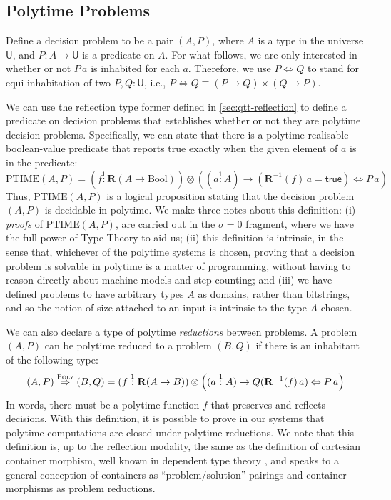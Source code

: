 \documentclass[acmsmall,screen]{acmart}
\newcommand{\BoolTy}{\mathrm{Bool}}
\newcommand{\cTrue}{\mathsf{true}}
\begin{document}
\subsection{Polytime Problems}
\label{sec:polytime-problems}

Define a decision problem to be a pair $(A, P)$, where $A$ is a type
in the universe $\mathsf{U}$, and $P : A \to \mathsf{U}$ is a
predicate on $A$. For what follows, we are only interested in whether
or not $P\,a$ is inhabited for each $a$. Therefore, we use
$P \Leftrightarrow Q$ to stand for equi-inhabitation of two
$P, Q : \mathsf{U}$, i.e.,
$P \Leftrightarrow Q \equiv (P \to Q) \times (Q \to P)$.

We can use the reflection type former defined in
\autoref{sec:qtt-reflection} to define a predicate on decision
problems that establishes whether or not they are polytime decision
problems. Specifically, we can state that there is a polytime
realisable boolean-value predicate that reports true exactly when the
given element of $a$ is in the predicate:
\begin{displaymath}
  \mathrm{PTIME}(A,P) =
    (f \stackrel1: \mathbf{R}(A \to \BoolTy)) \otimes \left((a \stackrel1: A) \to (\mathbf{R}^{-1}(f)\, a = \cTrue) \Leftrightarrow P\,a\right)
\end{displaymath}
Thus, $\mathrm{PTIME}(A,P)$ is a logical proposition stating that the
decision problem $(A,P)$ is decidable in polytime. We make three notes
about this definition: (i) \emph{proofs} of $\mathrm{PTIME}(A,P)$, are
carried out in the $\sigma = 0$ fragment, where we have the full power
of Type Theory to aid us; (ii) this definition is intrinsic, in the
sense that, whichever of the polytime systems is chosen, proving that
a decision problem is solvable in polytime is a matter of programming,
without having to reason directly about machine models and step
counting; and (iii) we have defined problems to have arbitrary types
$A$ as domains, rather than bitstrings, and so the notion of size
attached to an input is intrinsic to the type $A$ chosen.

We can also declare a type of polytime \emph{reductions} between
problems. A problem $(A, P)$ can be polytime reduced to a problem
$(B,Q)$ if there is an inhabitant of the following type:
\begin{displaymath}
  (A,P) \stackrel{\textsc{Poly}}\Rightarrow (B,Q) = (f \stackrel1: \mathbf{R}(A \to B)) \otimes \left((a \stackrel1: A) \to Q(\mathbf{R}^{-1}(f)\,a) \Leftrightarrow P\,a\right)
\end{displaymath}
In words, there must be a polytime function $f$ that preserves and
reflects decisions. With this definition, it is possible to prove in
our systems that polytime computations are closed under polytime
reductions. We note that this definition is, up to the reflection
modality, the same as the definition of cartesian container morphism,
well known in dependent type theory \cite{AbbottAG05}, and speaks to a
general conception of containers as ``problem/solution'' pairings and
container morphisms as problem reductions.
\end{document}
